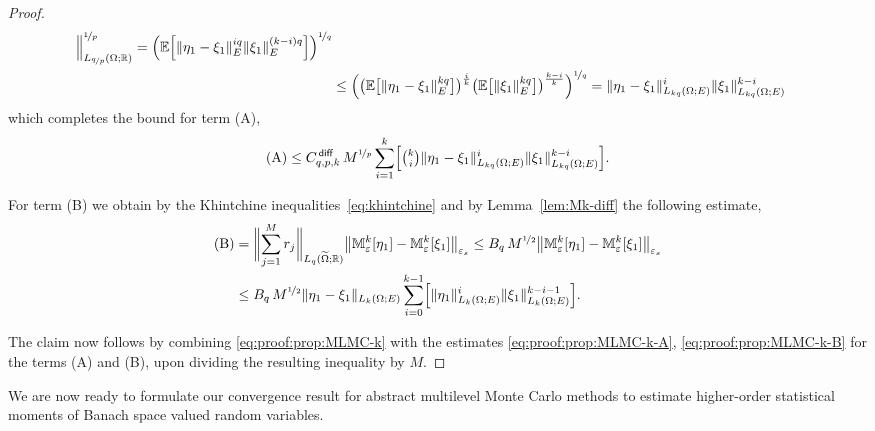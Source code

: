 \documentclass[reqno]{amsart}
\numberwithin{equation}{section}
\newcommand{\bbE}{\mathbb{E}}
\newcommand{\bbM}{\mathbb{M}}
\newcommand{\bbR}{\mathbb{R}}
\newcommand{\Mk}{\bbM^k_\varepsilon}
\newcommand{\norm}[2]{     \| #1       \|_{ #2 }}
\newcommand{\eps}{\varepsilon}
\newcommand{\Cdiff}{C^{\,\sf diff}_{q,p,k}}
\theoremstyle{remark}
\theoremstyle{definition}
\begin{document}
\begin{proof}
\begin{align*}
	\Bigr\|_{L_{\nicefrac{q}{p}}(\Omega;\bbR)}^{\nicefrac{1}{p}}  
	= 
	\Bigl( 
	\bbE\Bigl[ 
	\norm{ \eta_1 - \xi_1 }{E}^{iq} 
	\norm{ \xi_1 }{E}^{(k-i)q} 
	\Bigr] 
	\Bigr)^{\nicefrac{1}{q}} 
	\\
	&\leq 
	\Bigl( 
	\bigl( \bbE\bigl[ \norm{ \eta_1 - \xi_1 }{E}^{kq} \bigr] \bigr)^{\frac{i}{k}} 
	\bigl( \bbE\bigl[ \norm{ \xi_1 }{E}^{kq} \bigr] \bigr)^{\frac{k-i}{k}} 
	\Bigr)^{\nicefrac{1}{q}} 
	= 
	\norm{ \eta_1 - \xi_1 }{L_{kq}(\Omega;E)}^i
	\norm{ \xi_1 }{L_{kq}(\Omega;E)}^{k-i} 
	\end{align*} 
	which completes the bound for term (A), 
	\begin{equation}\label{eq:proof:prop:MLMC-k-A}  
	\text{(A)} 
	\leq 
	\Cdiff \, 
	M^{\nicefrac{1}{p}} 
	\sum_{i=1}^k 
	\Bigl[ 
	{\textstyle\binom{k}{i}} 
	\norm{ \eta_1 - \xi_1 }{L_{kq}(\Omega;E)}^i
	\norm{ \xi_1 }{L_{kq}(\Omega;E)}^{k-i}  
	\Bigr]. 
	\end{equation} 
	
	For term (B) we obtain 
	by the Khintchine inequalities~\eqref{eq:khintchine} 
	and by Lemma~\ref{lem:Mk-diff} 
	the following estimate,  
	\begin{equation}\label{eq:proof:prop:MLMC-k-B} 
	\begin{split}  
	\text{(B)} 
	&= 
	\biggl\| 
	\sum_{j=1}^M r_j 
	\biggr\|_{L_q(\widetilde{\Omega};\bbR)} 
	\bigl\| \Mk[\eta_1] - \Mk[\xi_1] \bigr\|_{\eps_s} 
	\leq 
	B_q \, M^{\nicefrac{1}{2}} 
	\bigl\| \Mk[\eta_1] - \Mk[\xi_1] \bigr\|_{\eps_s} 
	\\
	&\leq 
	B_q \, M^{\nicefrac{1}{2}}  
	\| \eta_1 - \xi_1 \|_{L_{k}(\Omega;E)} 
	\sum_{i=0}^{k-1} 
	\Bigl[ 
	\| \eta_1 \|_{L_{k}(\Omega;E)}^i 
	\| \xi_1 \|_{L_{k}(\Omega;E)}^{k-i-1} 
	\Bigr] . 
	\end{split} 
	\end{equation} 
	
	The claim now follows by 
	combining \eqref{eq:proof:prop:MLMC-k} with the estimates 
	\eqref{eq:proof:prop:MLMC-k-A}, \eqref{eq:proof:prop:MLMC-k-B} 
	for the terms (A) and (B),  
	upon dividing  the resulting inequality by $M$. 
\end{proof}  

We are now ready to formulate our convergence 
result for abstract multilevel Monte Carlo methods 
to estimate higher-order statistical moments of Banach 
space valued random variables. 
\end{document}
